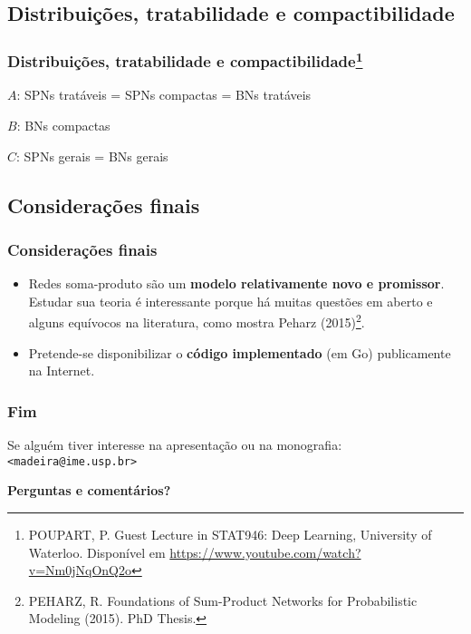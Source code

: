 \documentclass[dvipsnames]{beamer}
\begin{document}
  \subsection{Distribuições, tratabilidade e compactibilidade}

  \begin{frame}
    \frametitle{Distribuições, tratabilidade e compactibilidade\footnote{\scriptsize POUPART, P. Guest Lecture in STAT946: Deep Learning, University of Waterloo. Disponível em \url{https://www.youtube.com/watch?v=Nm0jNqOnQ2o}}}



    \vspace{1em}

    {\scriptsize \color{Red} $A$: SPNs tratáveis = SPNs compactas = BNs tratáveis}

    {\scriptsize \color{Blue} $B$: BNs compactas}

    {\scriptsize \color{Green} $C$: SPNs gerais = BNs gerais}
  \end{frame}

  \subsection{Considerações finais}

  \begin{frame}
    \frametitle{Considerações finais}

    \begin{itemize}
      \item Redes soma-produto são um \textbf{modelo relativamente novo e promissor}. Estudar sua teoria é interessante porque há muitas questões em aberto e alguns equívocos na literatura, como mostra Peharz (2015)\footnote{PEHARZ, R. Foundations of Sum-Product Networks for Probabilistic Modeling (2015). PhD Thesis.}.
      \item Pretende-se disponibilizar o \textbf{código implementado} (em Go) publicamente na Internet.
    \end{itemize}
  \end{frame}

  \begin{frame}
    \frametitle{Fim}

    Se alguém tiver interesse na apresentação ou na monografia:\\
    {\tt <madeira@ime.usp.br>}

    \vspace{1em}

    \textbf{Perguntas e comentários?}
  \end{frame}
\end{document}
